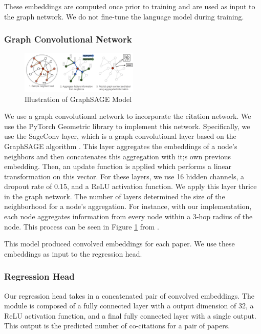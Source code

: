 \documentclass[10pt,twocolumn,letterpaper]{article}
\begin{document}
These embeddings are computed once prior to training and are used as input to the graph network. We do not fine-tune the language model during training.

\subsubsection{Graph Convolutional Network}
\begin{figure}
   \centering
   \includegraphics[width=0.5\textwidth]{figures/graphsage.png}
   \caption{Illustration of GraphSAGE Model}
   \label{fig:graph}
\end{figure}

We use a graph convolutional network to incorporate the citation network. We use the PyTorch Geometric library \cite{fey2019fast} to implement this network. Specifically, we use the SageConv layer, which is a graph convolutional layer based on the GraphSAGE algorithm \cite{hamilton2017inductive}. This layer aggregates the embeddings of a node's neighbors and then concatenates this aggregation with it;s own previous embedding. Then, an update function is applied which performs a linear transformation on this vector. For these layers, we use 16 hidden channels, a dropout rate of 0.15, and a ReLU activation function. We apply this layer thrice in the graph network. The number of layers determined the size of the neighborhood for a node's aggregation. For instance, with our implementation, each node aggregates information from every node within a 3-hop radius of the node. This process can be seen in Figure \ref{fig:graph} from \cite{hamilton2017inductive}. 

This model produced convolved embeddings for each paper. We use these embeddings as input to the regression head.

\subsubsection{Regression Head}

Our regression head takes in a concatenated pair of convolved embeddings.
The module is composed of a fully connected layer with a output dimension of 32, a ReLU activation function, and a final fully connected layer with a single output. This output is the predicted number of co-citations for a pair of papers.
\end{document}
